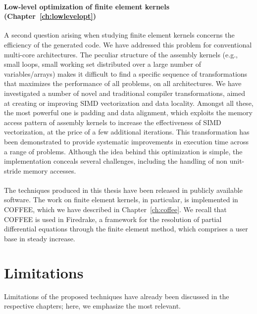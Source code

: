 \paragraph{Low-level optimization of finite element kernels (Chapter~\ref{ch:lowlevelopt})}
A second question arising when studying finite element kernels concerns the efficiency of the generated code. We have addressed this problem for conventional multi-core architectures. The peculiar structure of the assembly kernels (e.g., small loops, small working set distributed over a large number of variables/arrays) makes it difficult to find a specific sequence of transformations that maximizes the performance of all problems, on all architectures. We have investigated a number of novel and traditional compiler transformations, aimed at creating or improving SIMD vectorization and data locality. Amongst all these, the most powerful one is padding and data alignment, which exploits the memory access pattern of assembly kernels to increase the effectiveness of SIMD vectorization, at the price of a few additional iterations. This transformation has been demonstrated to provide systematic improvements in execution time across a range of problems. Although the idea behind this optimization is simple, the implementation conceals several challenges, including the handling of non unit-stride memory accesses.
~\\ 
~\\
The techniques produced in this thesis have been released in publicly available software. The work on finite element kernels, in particular, is implemented in COFFEE, which we have described in Chapter~\ref{ch:coffee}. We recall that COFFEE is used in Firedrake, a framework for the resolution of partial differential equations through the finite element method, which comprises a user base in steady increase.

\section{Limitations}
Limitations of the proposed techniques have already been discussed in the respective chapters; here, we emphasize the most relevant.
 
